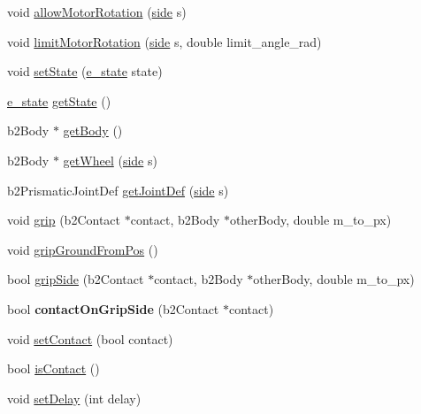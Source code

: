 \begin{DoxyCompactItemize}
\item 
void \mbox{\hyperlink{class_robot_afd7710fdb80993a6b6cc1aa9b88ed06a}{allow\+Motor\+Rotation}} (\mbox{\hyperlink{_robot_8h_afc015eff6557e84151d2e53b94375445}{side}} s)
\item 
void \mbox{\hyperlink{class_robot_aec072eed2d38baedbbd5132b760720d0}{limit\+Motor\+Rotation}} (\mbox{\hyperlink{_robot_8h_afc015eff6557e84151d2e53b94375445}{side}} s, double limit\+\_\+angle\+\_\+rad)
\item 
void \mbox{\hyperlink{class_robot_aaf534f168d818112ae1f6440b329eb0a}{set\+State}} (\mbox{\hyperlink{_robot_8h_a74a75e4700f1f71bb89d80765319e57b}{e\+\_\+state}} state)
\item 
\mbox{\hyperlink{_robot_8h_a74a75e4700f1f71bb89d80765319e57b}{e\+\_\+state}} \mbox{\hyperlink{class_robot_a65b9be1d9d45b004a6ea500dd5f85246}{get\+State}} ()
\item 
b2\+Body $\ast$ \mbox{\hyperlink{class_robot_a0ccd9dbef98a3d5bf6b29d8cd781bd25}{get\+Body}} ()
\item 
b2\+Body $\ast$ \mbox{\hyperlink{class_robot_a7c5ede93bcb2007be1f2bd6b2137f271}{get\+Wheel}} (\mbox{\hyperlink{_robot_8h_afc015eff6557e84151d2e53b94375445}{side}} s)
\item 
b2\+Prismatic\+Joint\+Def \mbox{\hyperlink{class_robot_a536c96ba5f6c7d8f04d86a50b1adcd72}{get\+Joint\+Def}} (\mbox{\hyperlink{_robot_8h_afc015eff6557e84151d2e53b94375445}{side}} s)
\item 
void \mbox{\hyperlink{class_robot_acf8f6c6260669a8568aa0d65404e3533}{grip}} (b2\+Contact $\ast$contact, b2\+Body $\ast$other\+Body, double m\+\_\+to\+\_\+px)
\item 
void \mbox{\hyperlink{class_robot_abf3907d53fca6572e6984b22515c69a7}{grip\+Ground\+From\+Pos}} ()
\item 
bool \mbox{\hyperlink{class_robot_aed1ba5683c53ac2b7e4a6c3fc7bcadba}{grip\+Side}} (b2\+Contact $\ast$contact, b2\+Body $\ast$other\+Body, double m\+\_\+to\+\_\+px)
\item 
\mbox{\label{class_robot_ae8fd58cd44b42df8a29005fb8bdd0b67}} 
bool {\bfseries contact\+On\+Grip\+Side} (b2\+Contact $\ast$contact)
\item 
void \mbox{\hyperlink{class_robot_af0d391d121096fa6f2d214bb8910c0a1}{set\+Contact}} (bool contact)
\item 
bool \mbox{\hyperlink{class_robot_add038ac4b424821791781171a9a45de4}{is\+Contact}} ()
\item 
void \mbox{\hyperlink{class_robot_a75e40c383e9191a17f25baa3aa5a35d8}{set\+Delay}} (int delay)

\end{DoxyCompactItemize}
